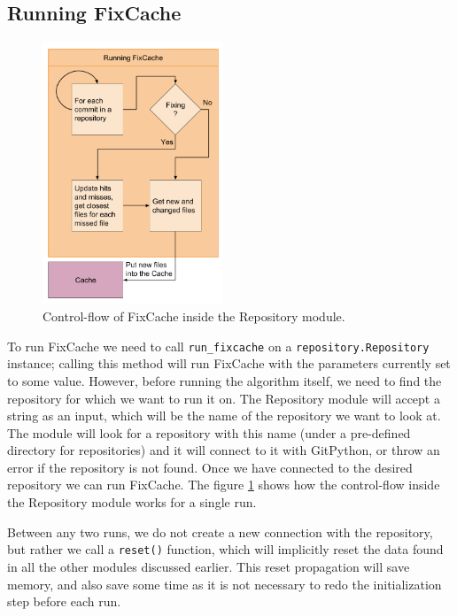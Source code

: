 \documentclass[12pt,twoside,notitlepage]{report}
\newcommand{\fxch}{FixCache}
\begin{document}
\subsection{Running \fxch{}}
\begin{figure}
\begin{center}
\vspace*{-0.5in}
\includegraphics[width=0.48\textwidth]{repository_module.png}
\end{center}
\caption{Control-flow of \fxch{} inside the Repository module.}
\label{run_fxch}
\end{figure}
To run \fxch{} we need to call \texttt{run\_fixcache} on a \texttt{repository.Repository} instance; calling this method will run \fxch{} with the parameters currently set to some value. However, before running the algorithm itself, we need to find the repository for which we want to run it on. The Repository module will accept a string as an input, which will be the name of the repository we want to look at. The module will look for a repository with this name (under a pre-defined directory for repositories) and it will connect to it with GitPython, or throw an error if the repository is not found. Once we have connected to the desired repository we can run \fxch{}. The figure \ref{run_fxch} shows how the control-flow inside the Repository module works for a single run.

Between any two runs, we do not create a new connection with the repository, but rather we call a \texttt{reset()} function, which will implicitly reset the data found in all the other modules discussed earlier. This reset propagation will save memory, and also save some time as it is not necessary to redo the initialization step before each run.
\end{document}
